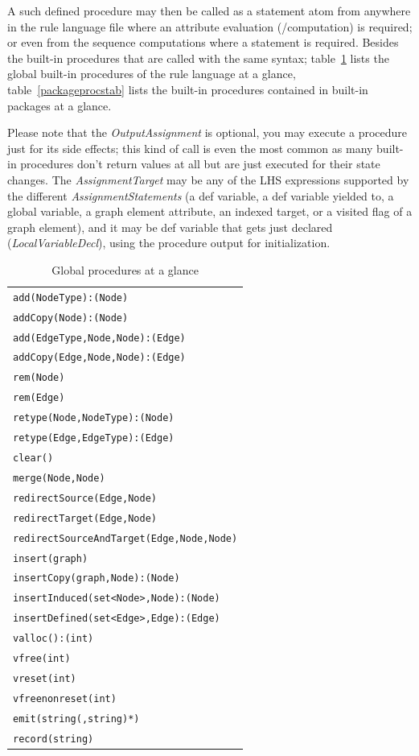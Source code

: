 A such defined procedure may then be called as a statement atom from anywhere in the rule language file where an attribute evaluation (/computation) is required; or even from the sequence computations where a statement is required.
Besides the built-in procedures that are called with the same syntax;
table~\ref{procstab} lists the global built-in procedures of the rule language at a glance,
table~\ref{packageprocstab} lists the built-in procedures contained in built-in packages at a glance.

Please note that the \emph{OutputAssignment} is optional, you may execute a procedure just for its side effects; this kind of call is even the most common as many built-in procedures don't return values at all but are just executed for their state changes.
The \emph{AssignmentTarget} may be any of the LHS expressions supported by the different \emph{AssignmentStatements} (a def variable, a def variable yielded to, a global variable, a graph element attribute, an indexed target, or a visited flag of a graph element), and it may be def variable that gets just declared (\emph{LocalVariableDecl}), using the procedure output for initialization.

\begin{table}[htbp]
\centering
\begin{tabular}{|l|}
\hline
\texttt{add(NodeType):(Node)}\\
\texttt{addCopy(Node):(Node)}\\
\texttt{add(EdgeType,Node,Node):(Edge)}\\
\texttt{addCopy(Edge,Node,Node):(Edge)}\\
\texttt{rem(Node)}\\
\texttt{rem(Edge)}\\
\texttt{retype(Node,NodeType):(Node)}\\
\texttt{retype(Edge,EdgeType):(Edge)}\\
\texttt{clear()}\\
\hline
\texttt{merge(Node,Node)}\\
\texttt{redirectSource(Edge,Node)}\\
\texttt{redirectTarget(Edge,Node)}\\
\texttt{redirectSourceAndTarget(Edge,Node,Node)}\\
\hline
\texttt{insert(graph)}\\
\texttt{insertCopy(graph,Node):(Node)}\\
\texttt{insertInduced(set<Node>,Node):(Node)}\\
\texttt{insertDefined(set<Edge>,Edge):(Edge)}\\
\hline
\texttt{valloc():(int)}\\
\texttt{vfree(int)}\\
\texttt{vreset(int)}\\
\texttt{vfreenonreset(int)}\\
\hline
\texttt{emit(string(,string)*)}\\
\texttt{record(string)}\\
\hline
\end{tabular}
\caption{Global procedures at a glance}
\label{procstab}
\end{table}

